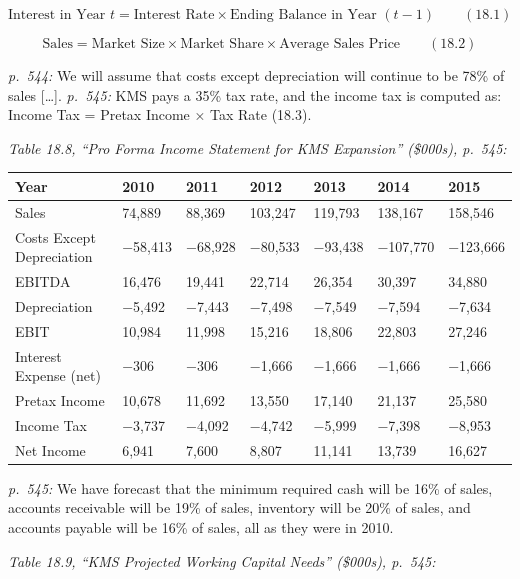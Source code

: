 \documentclass[11pt,a4paper]{article}
\begin{document}
\[\text{Interest in Year } t = \text{Interest Rate} \times \text{Ending Balance in Year } (t-1) \qquad (18.1)\]

\[\text{Sales} = \text{Market Size} \times \text{Market Share} \times \text{Average Sales Price} \qquad (18.2)\]

\emph{p.~544:} We will assume that costs except depreciation will continue to be 78\% of sales
{[}\ldots{]}. \emph{p.~545:} KMS pays a 35\% tax rate, and the income tax is computed as: Income Tax
= Pretax Income × Tax Rate (18.3).

\emph{Table 18.8, ``Pro Forma Income Statement for KMS Expansion'' (\$000s), p.~545:}

{\def\LTcaptype{none} %
\begin{longtable}[]{@{}lllllll@{}}
\toprule\noalign{}
Year & 2010 & 2011 & 2012 & 2013 & 2014 & 2015 \\
\midrule\noalign{}
\endhead
\bottomrule\noalign{}
\endlastfoot
Sales & 74,889 & 88,369 & 103,247 & 119,793 & 138,167 & 158,546 \\
Costs Except Depreciation & −58,413 & −68,928 & −80,533 & −93,438 & −107,770 & −123,666 \\
EBITDA & 16,476 & 19,441 & 22,714 & 26,354 & 30,397 & 34,880 \\
Depreciation & −5,492 & −7,443 & −7,498 & −7,549 & −7,594 & −7,634 \\
EBIT & 10,984 & 11,998 & 15,216 & 18,806 & 22,803 & 27,246 \\
Interest Expense (net) & −306 & −306 & −1,666 & −1,666 & −1,666 & −1,666 \\
Pretax Income & 10,678 & 11,692 & 13,550 & 17,140 & 21,137 & 25,580 \\
Income Tax & −3,737 & −4,092 & −4,742 & −5,999 & −7,398 & −8,953 \\
Net Income & 6,941 & 7,600 & 8,807 & 11,141 & 13,739 & 16,627 \\
\end{longtable}
}

\emph{p.~545:} We have forecast that the minimum required cash will be 16\% of sales, accounts
receivable will be 19\% of sales, inventory will be 20\% of sales, and accounts payable will be 16\%
of sales, all as they were in 2010.

\emph{Table 18.9, ``KMS Projected Working Capital Needs'' (\$000s), p.~545:}
\end{document}
